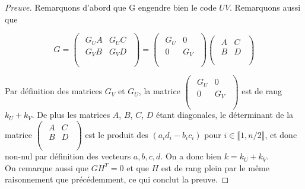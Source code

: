 \documentclass[12pt]{article}
\theoremstyle{plain}
\begin{document}
\begin{proof}[Preuve]
Remarquons d'abord que G engendre bien le code $UV$. Remarquons aussi que 

$$
G = 
\begin{pmatrix}
\begin{array}{c|c}
G_UA & G_UC \\
 \hline 
G_VB & G_VD \\
\end{array} \\
\end{pmatrix}
= 
\begin{pmatrix}
\begin{array}{c|c}
G_U & 0 \\
 \hline 
0 & G_V \\
\end{array} \\
\end{pmatrix} 
\begin{pmatrix}
\begin{array}{c|c}
A & C \\
 \hline 
B & D \\
\end{array} \\
\end{pmatrix}
$$

\noindent Par définition des matrices $G_V$ et $G_U$, la matrice $ 
\begin{pmatrix}
\begin{array}{c|c}
G_U & 0 \\
 \hline 
0 & G_V \\
\end{array} \\
\end{pmatrix} $ est de rang $k_U + k_V$. De plus les matrices $A$, $B$, $C$, $D$ étant diagonales, le déterminant de la matrice $\begin{pmatrix}
\begin{array}{c|c}
A & C \\
 \hline 
B & D \\
\end{array} \\
\end{pmatrix}$
est le produit des $(a_id_i - b_ic_i)$ pour $i \in \llbracket 1, n/2\rrbracket$, et donc non-nul par définition des vecteurs $a,b,c,d$. On a donc bien $k = k_U + k_V$. \\
On remarque aussi que $GH^T = 0$ et que $H$ est de rang plein par le même raisonnement que précédemment, ce qui conclut la preuve.
\end{proof}
\end{document}
